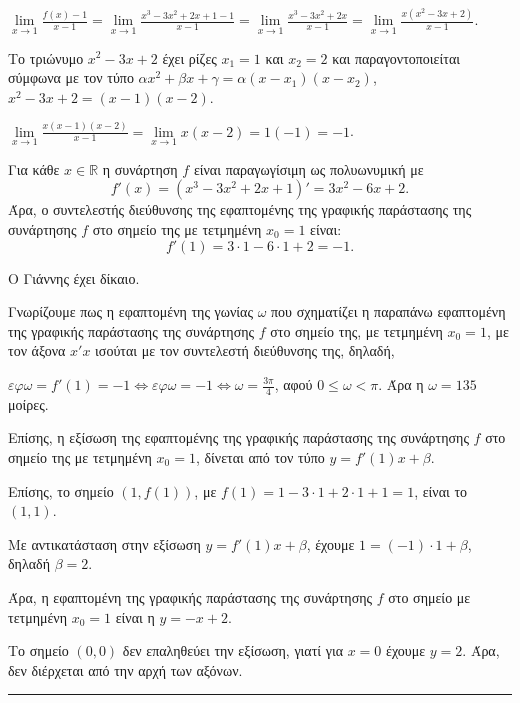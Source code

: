 \begin{alist}
\item $\lim\limits_{x \to 1} \frac{f(x)-1}{x-1} = \lim\limits_{x \to 1} \frac{x^3-3x^2+2x+1-1}{x-1} = \lim\limits_{x \to 1} \frac{x^3-3x^2+2x}{x-1} = \lim\limits_{x \to 1} \frac{x(x^2-3x+2)}{x-1}$.

Το τριώνυμο $x^2 - 3x + 2$ έχει ρίζες $x_1 = 1$ και $x_2 = 2$ και παραγοντοποιείται σύμφωνα με τον τύπο $\alpha x^2 + \beta x + \gamma = \alpha(x-x_1)(x-x_2)$, $x^2 - 3x + 2 = (x-1)(x-2)$.

$\lim\limits_{x \to 1} \frac{x(x-1)(x-2)}{x-1} = \lim\limits_{x \to 1} x(x-2) = 1(-1) = -1$.

\item Για κάθε $x \in \mathbb{R}$ η συνάρτηση $f$ είναι παραγωγίσιμη ως πολυωνυμική με
\[ f'(x) = (x^3 - 3x^2 + 2x + 1)' = 3x^2 - 6x + 2. \]
Άρα, ο συντελεστής διεύθυνσης της εφαπτομένης της γραφικής παράστασης της συνάρτησης $f$ στο σημείο της με τετμημένη $x_0 = 1$ είναι:
\[ f'(1) = 3 \cdot 1 - 6 \cdot 1 + 2 = -1. \]

\item Ο Γιάννης έχει δίκαιο.

Γνωρίζουμε πως η εφαπτομένη της γωνίας $\omega$ που σχηματίζει η παραπάνω εφαπτομένη της γραφικής παράστασης της συνάρτησης $f$ στο σημείο της, με τετμημένη $x_0 = 1$, με τον άξονα $x'x$ ισούται με τον συντελεστή διεύθυνσης της, δηλαδή,

$\varepsilon\varphi\omega = f'(1) = -1 \Leftrightarrow \varepsilon\varphi\omega = -1 \Leftrightarrow \omega = \frac{3\pi}{4}$, αφού $0 \leq \omega < \pi$. Άρα η $\omega=135$ μοίρες.

Επίσης, η εξίσωση της εφαπτομένης της γραφικής παράστασης της συνάρτησης $f$ στο σημείο της με τετμημένη $x_0 = 1$, δίνεται από τον τύπο $y = f'(1)x + \beta$.

Επίσης, το σημείο $(1,f(1))$, με $f(1) = 1 - 3 \cdot 1 + 2 \cdot 1 + 1 = 1$, είναι το $(1,1)$.

Με αντικατάσταση στην εξίσωση $y = f'(1)x + \beta$, έχουμε $1 = (-1) \cdot 1 + \beta$, δηλαδή $\beta = 2$.

Άρα, η εφαπτομένη της γραφικής παράστασης της συνάρτησης $f$ στο σημείο με τετμημένη $x_0 = 1$ είναι η $y = -x + 2$.

Το σημείο $(0,0)$ δεν επαληθεύει την εξίσωση, γιατί για $x = 0$ έχουμε $y = 2$. Άρα, δεν διέρχεται από την αρχή των αξόνων.
\end{alist}
\vspace{6mm}
\noindent\rule{\textwidth}{0.4pt}
\vspace{6mm}

